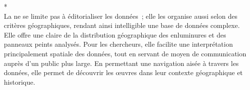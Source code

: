 * \\

La  ne se limite pas à éditorialiser les données~; elle les organise aussi selon des critères géographiques, rendant ainsi intelligible une base de données complexe. Elle offre une  claire de la distribution géographique des enluminures et des panneaux peints analysés. Pour les chercheurs, elle facilite une interprétation principalement spatiale des données, tout en servant de moyen de communication auprès d'un public plus large. En permettant une navigation aisée à travers les données, elle permet de découvrir les œuvres dans leur contexte géographique et historique.